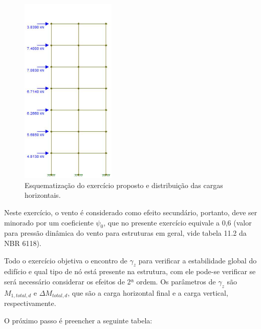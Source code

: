 \begin{figure}[H]
	\begin{center}
	\caption{Esquematização do exercício proposto e distribuição das cargas horizontais.}
    	\includegraphics[width=0.4\textwidth]{Exercicios/Imagens/Exercicio-portico.png}
	\end{center}
\end{figure}

Neste exercício, o vento é considerado como efeito secundário, portanto, deve ser minorado por um coeficiente $\psi_0$, que no presente exercício equivale a 0,6 (valor para pressão dinâmica do vento para estruturas em geral, vide tabela 11.2 da NBR 6118).

Todo o exercício objetiva o encontro de $\gamma_z$ para verificar a estabilidade global do edifício e qual tipo de nó está presente na estrutura, com ele pode-se verificar se será necessário considerar os efeitos de 2ª ordem. Os parâmetros de $\gamma_z$ são $M_{1, total, d}$ e $\Delta M_{total, d}$, que são a carga horizontal final e a carga vertical, respectivamente.

O próximo passo é preencher a seguinte tabela:

